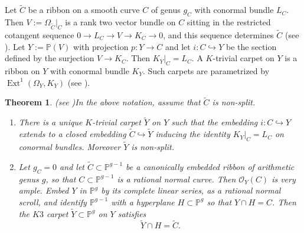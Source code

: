 \documentclass[11pt,twoside]{amsart}
\theoremstyle{plain}
\newtheorem{theorem}{Theorem}[section]
\theoremstyle{definition}
\newcommand{\PP}{\mathbb{P}}
\newcommand{\OO}{\mathcal{O}}
\newcommand{\Ext}{\operatorname{Ext}}
\newcommand{\Yt}{\widetilde{Y}}
\newcommand{\Ct}{\widetilde{C}}
\begin{document}
\begin{enumerate}
\end{enumerate}

Let $\Ct$ be a ribbon on a smooth curve $C$ of genus $g_C$ with conormal bundle $L_C$. Then $V := \Omega_{\Ct}|_C$ is a rank two vector bundle on $C$ sitting in the restricted cotangent sequence $0 \to L_C \to V \to K_C \to 0$, and this sequence determines $\Ct$ (see \cite{BE95}). Let $Y := \PP(V)$ with projection $p\colon Y \to C$ and let $i\colon C \hookrightarrow Y$ be the section defined by the surjection $V \to K_C$. Then $K_Y|_C = L_C$. A $K$-trivial carpet on $Y$ is a ribbon on $Y$ with conormal bundle $K_Y$. Such carpets are parametrized by $\Ext^1(\Omega_Y,K_Y)$ (see \cite{BE95}).

\begin{theorem}(see )\label{thm:extension intro}
In the above notation, assume that $\Ct$ is non-split.
\begin{enumerate}
    \item There is a unique $K$-trivial carpet $\Yt$ on $Y$ such that the embedding $i\colon C \hookrightarrow Y$ extends to a closed embedding $\Ct \hookrightarrow \Yt$ inducing the identity $K_Y|_C = L_C$ on conormal bundles. Moreover $\Yt$ is non-split.
    \item Let $g_C = 0$ and let $\Ct \subset \PP^{g-1}$ be a canonically embedded ribbon of arithmetic genus $g$, so that $C \subset \PP^{g-1}$ is a rational normal curve. Then $\OO_Y(C)$ is very ample. Embed $Y$ in $\PP^g$ by its complete linear series, as a rational normal scroll, and identify $\PP^{g-1}$ with a hyperplane $H \subset \PP^g$ so that $Y \cap H = C$. Then the $K3$ carpet $\Yt \subset \PP^g$ on $Y$ satisfies
    \[
    \Yt \cap H = \Ct .
    \]
\end{enumerate}
\end{theorem}
\end{document}
